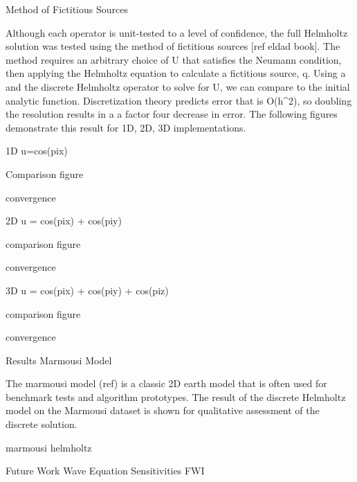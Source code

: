 Method of Fictitious Sources

Although each operator is unit-tested to a level of confidence, the full Helmholtz solution was tested using the method of fictitious sources [ref eldad book]. The method requires an arbitrary choice of U that satisfies the Neumann condition, then applying the Helmholtz equation to calculate a fictitious source, q. Using a and the discrete Helmholtz operator to solve for U, we can compare to the initial analytic function. Discretization theory predicts error that is O(h^2), so doubling the resolution results in a a factor four decrease in error. The following figures demonstrate this result for 1D, 2D, 3D implementations.
	
	1D
	u=cos(pix)
	
	Comparison figure
	
	convergence
	
	2D
	u = cos(pix) + cos(piy)
	
	comparison figure
	
	convergence
	
	3D
	u = cos(pix) + cos(piy) + cos(piz)
	
	comparison figure
	
	convergence
	
	
	
Results
	Marmousi Model
	
The marmousi model (ref) is a classic 2D earth model that is often used for benchmark tests and algorithm prototypes. The result of the discrete Helmholtz model on the Marmousi dataset is shown for qualitative assessment of the discrete solution.

marmousi
helmholtz
	
	
	
	
Future Work
	Wave Equation
	Sensitivities 
	FWI